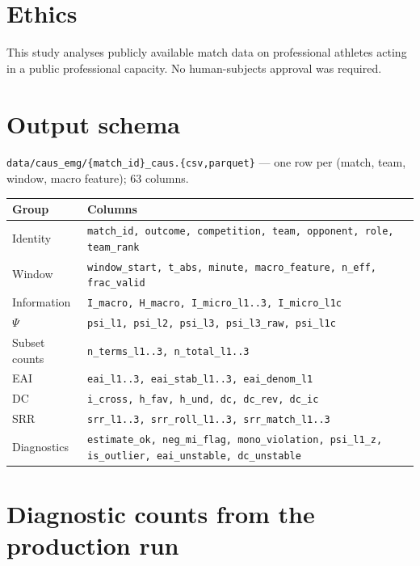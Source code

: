 \documentclass[11pt,a4paper]{article}
\newcommand{\code}[1]{\texttt{\small #1}}
\begin{document}
\section*{Ethics}

This study analyses publicly available match data on professional athletes acting in a
public professional capacity. No human-subjects approval was required.




\appendix
\section{Output schema}

\code{data/caus\_emg/\{match\_id\}\_caus.\{csv,parquet\}} --- one row per (match, team,
window, macro feature); 63 columns.

\begin{table}[H]
\centering
\small
\begin{tabular}{@{}lp{9.6cm}@{}}
\toprule
\textbf{Group} & \textbf{Columns} \\
\midrule
Identity      & \code{match\_id, outcome, competition, team, opponent, role, team\_rank} \\
Window        & \code{window\_start, t\_abs, minute, macro\_feature, n\_eff, frac\_valid} \\
Information   & \code{I\_macro, H\_macro, I\_micro\_l1..3, I\_micro\_l1c} \\
$\Psi$        & \code{psi\_l1, psi\_l2, psi\_l3, psi\_l3\_raw, psi\_l1c} \\
Subset counts & \code{n\_terms\_l1..3, n\_total\_l1..3} \\
EAI           & \code{eai\_l1..3, eai\_stab\_l1..3, eai\_denom\_l1} \\
DC            & \code{i\_cross, h\_fav, h\_und, dc, dc\_rev, dc\_ic} \\
SRR           & \code{srr\_l1..3, srr\_roll\_l1..3, srr\_match\_l1..3} \\
Diagnostics   & \code{estimate\_ok, neg\_mi\_flag, mono\_violation, psi\_l1\_z, is\_outlier, eai\_unstable, dc\_unstable} \\
\bottomrule
\end{tabular}
\end{table}

\section{Diagnostic counts from the production run}
\end{document}
